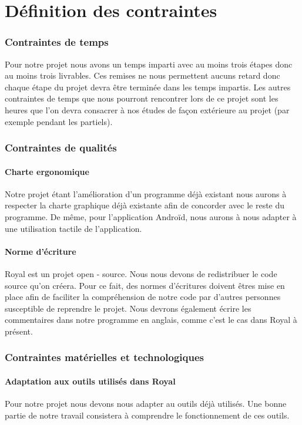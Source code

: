 \part{Définition des contraintes}


\section{Contraintes de temps}
Pour notre projet nous avons un temps imparti avec au moins trois étapes donc au moins trois livrables. Ces remises ne nous permettent aucuns retard donc chaque étape du projet devra être terminée dans les temps impartis.
Les autres contraintes de temps que nous pourront rencontrer lors de ce projet sont les heures que l'on devra consacrer à nos études de façon extérieure au projet (par exemple pendant les partiels). 

\section{Contraintes de qualités}

\subsection{Charte ergonomique}
Notre projet étant l'amélioration d'un programme déjà existant nous aurons à respecter la charte graphique déjà existante afin de concorder avec le reste du programme. 
De même, pour l'application Androïd, nous aurons à nous adapter à une utilisation tactile de l'application. 

\subsection{Norme d'écriture}
Royal est un projet open - source. 
Nous nous devons de redistribuer le code source qu'on créera.
Pour ce fait, des normes d'écritures doivent êtres mise en place afin de faciliter la compréhension de notre code par d'autres personnes susceptible de reprendre le projet. 
Nous devrons également écrire les commentaires dans notre programme en anglais, comme c'est le cas dans Royal à présent.

\section{Contraintes matérielles et technologiques}

\subsection{Adaptation aux outils utilisés dans Royal}
Pour notre projet nous devons nous adapter au outils déjà utilisés. Une bonne partie de notre travail consistera à comprendre le fonctionnement de ces outils.

